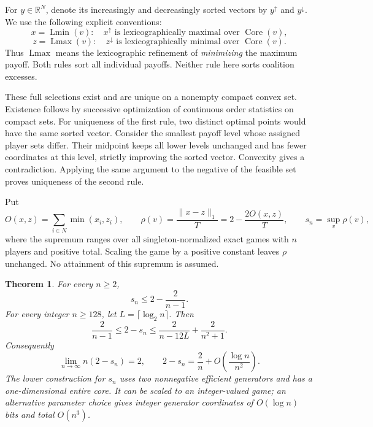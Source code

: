 \documentclass[11pt]{article}
\newtheorem{theorem}{Theorem}
\newcommand{\Lmin}{\operatorname{Lmin}}
\newcommand{\Lmax}{\operatorname{Lmax}}
\newcommand{\Core}{\operatorname{Core}}
\begin{document}
For $y\in\mathbb R^N$, denote its increasingly and decreasingly sorted
vectors by $y^\uparrow$ and $y^\downarrow$. We use the following explicit
conventions:
\[
 x=\Lmin(v):\quad x^\uparrow
       \text{ is lexicographically maximal over }\Core(v),
\]
\[
 z=\Lmax(v):\quad z^\downarrow
       \text{ is lexicographically minimal over }\Core(v).
\]
Thus $\Lmax$ means the lexicographic refinement of \emph{minimizing} the
maximum payoff. Both rules sort all individual payoffs. Neither rule here
sorts coalition excesses.

These full selections exist and are unique on a nonempty compact convex
set. Existence follows by successive optimization of continuous order
statistics on compact sets. For uniqueness of the first rule, two distinct
optimal points would have the same sorted vector. Consider the smallest
payoff level whose assigned player sets differ. Their midpoint keeps all
lower levels unchanged and has fewer coordinates at this level, strictly
improving the sorted vector. Convexity gives a contradiction. Applying the
same argument to the negative of the feasible set proves uniqueness of the
second rule.

Put
\begin{equation}\label{eq:distance}
 O(x,z)=\sum_{i\in N}\min(x_i,z_i),\qquad
 \rho(v)=\frac{\|x-z\|_1}{T}=2-\frac{2O(x,z)}T,
 \qquad s_n=\sup_v\rho(v),
\end{equation}
where the supremum ranges over all singleton-normalized exact games with
$n$ players and positive total. Scaling the game by a positive constant
leaves $\rho$ unchanged. No attainment of this supremum is assumed.

\begin{theorem}\label{thm:main}
For every $n\ge2$,
\[
 s_n\le2-\frac2{n-1}.
\]
For every integer $n\ge128$, let $L=\lceil\log_2 n\rceil$. Then
\begin{equation}\label{eq:finite-squeeze}
 \frac2{n-1}\le 2-s_n
       \le\frac2{n-12L}+\frac2{n^2+1}.
\end{equation}
Consequently
\begin{equation}\label{eq:asymptotic}
 \lim_{n\to\infty}n(2-s_n)=2,
 \qquad 2-s_n=\frac2n+O\!\left(\frac{\log n}{n^2}\right).
\end{equation}
The lower construction for $s_n$ uses two nonnegative efficient generators
and has a one-dimensional entire core. It can be scaled to an integer-valued
game; an alternative parameter choice gives integer generator coordinates
of $O(\log n)$ bits and total $O(n^3)$.
\end{theorem}
\end{document}
